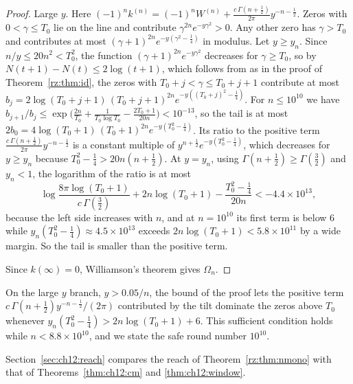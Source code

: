 \begin{proof}
Large $y$. Here $(-1)^nk^{(n)}=(-1)^nW^{(n)}+\frac{c\,\Gamma(n+\frac12)}{2\pi}y^{-n-\frac12}$. Zeros with $0<\gamma\le T_0$ lie on the line and contribute $\gamma^{2n}e^{-y\gamma^2}>0$. Any other zero has $\gamma>T_0$ and contributes at most $(\gamma+1)^{2n}e^{-y(\gamma^2-\frac14)}$ in modulus. Let $y\ge y_n$. Since $n/y\le20n^2<T_0^2$, the function $(\gamma+1)^{2n}e^{-y\gamma^2}$ decreases for $\gamma\ge T_0$, so by $N(t+1)-N(t)\le2\log(t+1)$, which follows from \cite{HSW22} as in the proof of Theorem~\ref{rz:thm:id}, the zeros with $T_0+j<\gamma\le T_0+j+1$ contribute at most $b_j=2\log(T_0+j+1)\,(T_0+j+1)^{2n}e^{-y((T_0+j)^2-\frac14)}$. For $n\le10^{10}$ we have $b_{j+1}/b_j\le\exp\bigl(\frac{2n}{T_0}+\frac{1}{T_0\log T_0}-\frac{2T_0+1}{20n}\bigr)<10^{-13}$, so the tail is at most $2b_0=4\log(T_0+1)\,(T_0+1)^{2n}e^{-y(T_0^2-\frac14)}$. Its ratio to the positive term $\frac{c\,\Gamma(n+\frac12)}{2\pi}y^{-n-\frac12}$ is a constant multiple of $y^{n+\frac12}e^{-y(T_0^2-\frac14)}$, which decreases for $y\ge y_n$ because $T_0^2-\frac14>20n(n+\frac12)$. At $y=y_n$, using $\Gamma(n+\frac12)\ge\Gamma(\frac32)$ and $y_n<1$, the logarithm of the ratio is at most
\[
\log\frac{8\pi\log(T_0+1)}{c\,\Gamma(\frac32)}+2n\log(T_0+1)-\frac{T_0^2-\frac14}{20n}<-4.4\times10^{13},
\]
because the left side increases with $n$, and at $n=10^{10}$ its first term is below $6$ while $y_n(T_0^2-\frac14)\approx4.5\times10^{13}$ exceeds $2n\log(T_0+1)<5.8\times10^{11}$ by a wide margin. So the tail is smaller than the positive term.

Since $k(\infty)=0$, Williamson's theorem \cite{Williamson} gives $\Omega_n$.
\end{proof}

On the large $y$ branch, $y>0.05/n$, the bound of the proof lets the positive term $c\,\Gamma(n+\frac12)y^{-n-\frac12}/(2\pi)$ contributed by the tilt dominate the zeros above $T_0$ whenever $y_n(T_0^2-\frac14)>2n\log(T_0+1)+6$. This sufficient condition holds while $n<8.8\times10^{10}$, and we state the safe round number $10^{10}$.

Section~\ref{sec:ch12:reach} compares the reach of Theorem~\ref{rz:thm:nmono} with that of Theorems~\ref{thm:ch12:cm} and \ref{thm:ch12:window}.

